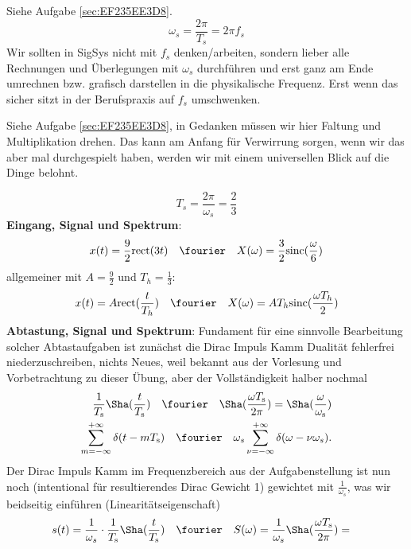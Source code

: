\begin{Werkzeug}
Siehe Aufgabe \ref{sec:EF235EE3D8}.
$$\omega_s = \frac{2\pi}{T_s} = 2 \pi f_s$$
Wir sollten in SigSys nicht mit $f_s$ denken/arbeiten, sondern lieber alle Rechnungen und Überlegungen
mit $\omega_s$ durchführen und erst ganz am Ende umrechnen bzw. grafisch darstellen in die physikalische Frequenz.
Erst wenn das sicher sitzt in der Berufspraxis auf $f_s$ umschwenken.
\end{Werkzeug}
\begin{Ansatz}
Siehe Aufgabe \ref{sec:EF235EE3D8}, in Gedanken müssen wir hier Faltung und
Multiplikation drehen. Das kann am Anfang für Verwirrung sorgen, wenn wir das
aber mal durchgespielt haben, werden wir mit einem
universellen Blick auf die Dinge belohnt.
\end{Ansatz}
\begin{ExCalc}
$$T_s = \frac{2\pi}{\omega_s} = \frac{2}{3}$$
\textbf{Eingang, Signal und Spektrum}:
\begin{align}
x(t) = \frac{9}{2} \mathrm{rect}(3 t)
\quad\fourier\quad
X(\omega) = \frac{3}{2}\mathrm{sinc}(\frac{\omega}{6})
\end{align}
allgemeiner mit $A = \frac{9}{2}$ und $T_h=\frac{1}{3}$:
\begin{align}
x(t) = A \mathrm{rect}(\frac{t}{T_h})
\quad\fourier\quad
X(\omega) = A T_h\mathrm{sinc}(\frac{\omega T_h}{2})
\end{align}
%
\textbf{Abtastung, Signal und Spektrum}:
Fundament für eine sinnvolle Bearbeitung solcher Abtastaufgaben ist zunächst die
Dirac Impuls Kamm Dualität fehlerfrei niederzuschreiben, nichts Neues, weil bekannt aus
der Vorlesung und Vorbetrachtung zu dieser Übung, aber der Vollständigkeit halber nochmal
\begin{align}
\frac{1}{T_\mathrm{s}} {\Sha}(\frac{t}{T_\mathrm{s}}) \quad\fourier\quad
{\Sha}(\frac{\omega T_\mathrm{s}}{2 \pi}) =
\Sha(\frac{\omega}{\omega_\mathrm{s}})\\
\sum_{m=-\infty}^{+\infty} \delta(t-m T_\mathrm{s}) \quad\fourier\quad
\omega_s \sum_{\nu=-\infty}^{+\infty} \delta(\omega-\nu \omega_s).
\end{align}
%
Der Dirac Impuls Kamm im Frequenzbereich aus der Aufgabenstellung ist nun noch
(intentional für resultierendes Dirac Gewicht 1) gewichtet mit $\frac{1}{\omega_s}$,
was wir beidseitig einführen (Linearitätseigenschaft)
\begin{align}
s(t) = \frac{1}{\omega_s}\cdot\frac{1}{T_\mathrm{s}} {\Sha}(\frac{t}{T_\mathrm{s}}) &\quad\fourier\quad
S(\omega) = \frac{1}{\omega_s} {\Sha}(\frac{\omega T_\mathrm{s}}{2 \pi}) =

\end{align}
\end{ExCalc}
